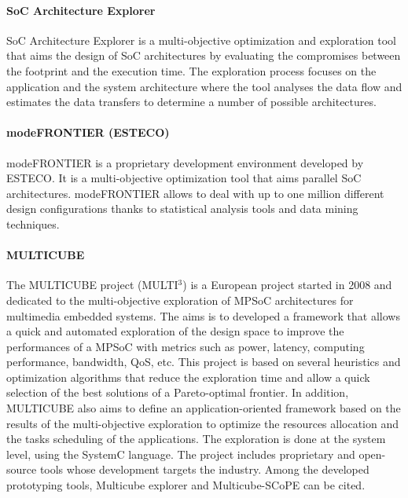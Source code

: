 \paragraph{SoC Architecture Explorer}

SoC Architecture Explorer \cite{ueda05architecture} is a multi-objective optimization and exploration tool that aims the design of SoC architectures by evaluating the compromises between the footprint and the execution time. The exploration process focuses on the application and the system architecture where the tool analyses the data flow and estimates the data transfers to determine a number of possible architectures.

\paragraph{modeFRONTIER (ESTECO)}

modeFRONTIER \cite{esteco01} is a proprietary development environment developed by ESTECO. It is a multi-objective optimization tool that aims parallel SoC architectures. modeFRONTIER allows to deal with up to one million different design configurations thanks to statistical analysis tools and data mining techniques.

\paragraph{MULTICUBE}

The MULTICUBE project (MULTI$^{3}$) \cite{multicube08, Silvanoetal09} is a European project started in 2008 and dedicated to the multi-objective exploration of MPSoC architectures for multimedia embedded systems. The aims is to developed a framework that allows a quick and automated exploration of the design space to improve the performances of a MPSoC with metrics such as power, latency, computing performance, bandwidth, QoS, etc. This project is based on several heuristics and optimization algorithms that reduce the exploration time and allow a quick selection of the best solutions of a Pareto-optimal frontier. In addition, MULTICUBE also aims to define an application-oriented framework based on the results of the multi-objective exploration to optimize the resources allocation and the tasks scheduling of the applications. The exploration is done at the system level, using the SystemC language. The project includes proprietary and open-source tools whose development targets the industry. Among the developed prototyping tools, Multicube explorer and Multicube-SCoPE can be cited.

